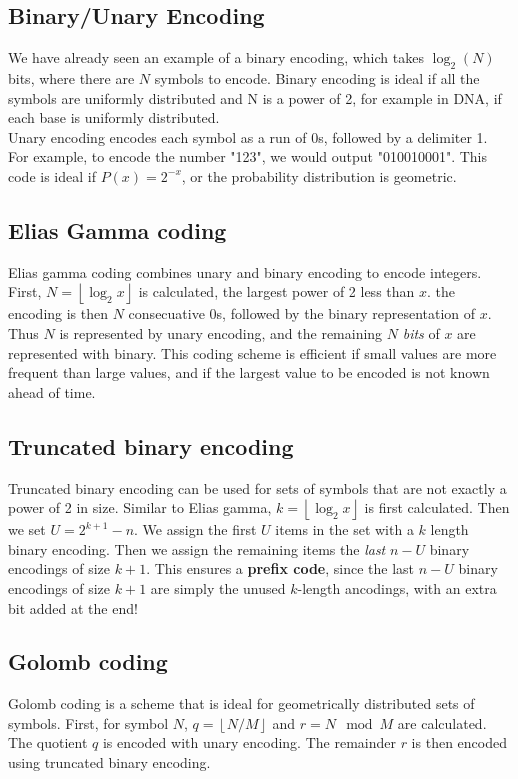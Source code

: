 \documentclass[12pt]{article}
\begin{document}
\subsection{Binary/Unary Encoding}
We have already seen an example of a binary encoding, which takes $\log_2(N)$ bits, where there are $N$ symbols to encode. Binary encoding is ideal if all the symbols are uniformly distributed and N is a power of 2, for example in DNA, if each base is uniformly distributed.\\[10pt]
Unary encoding encodes each symbol as a run of 0s, followed by a delimiter 1. For example, to encode the number "123", we would output "010010001". This code is ideal if $P(x) = 2^{-x}$, or the probability distribution is geometric.
\subsection{Elias Gamma coding}
Elias gamma coding combines unary and binary encoding to encode integers. First, $N = \left \lfloor{\log_2x}\right \rfloor $ is calculated, the largest power of 2 less than $x$. the encoding is then $N$ consecuative 0s, followed by the binary representation of $x$. Thus $N$ is represented by unary encoding, and the remaining $N$ \textit{bits} of $x$ are represented with binary. This coding scheme is efficient if small values are more frequent than large values, and if the largest value to be encoded is not known ahead of time.
\subsection{Truncated binary encoding}
Truncated binary encoding can be used for sets of symbols that are not exactly a power of 2 in size. Similar to Elias gamma, $k = \left \lfloor{\log_2x}\right \rfloor $ is first calculated. Then we set $U = 2^{k + 1} - n$. We assign the first $U$ items in the set with a $k$ length binary encoding. Then we assign the remaining items the \textit{last} $n-U$ binary encodings of size $k+1$. This ensures a \textbf{prefix code}, since the last $n-U$ binary encodings of size $k+1$ are simply the unused $k$-length ancodings, with an extra bit added at the end!

\subsection{Golomb coding}
Golomb coding is a scheme that is ideal for geometrically distributed sets of symbols. First, for symbol $N$, $q = \left \lfloor{N / M}\right \rfloor $ and $r = N \mod M$ are calculated. The quotient $q$ is encoded with unary encoding. The remainder $r$ is then encoded using truncated binary encoding.
\end{document}
